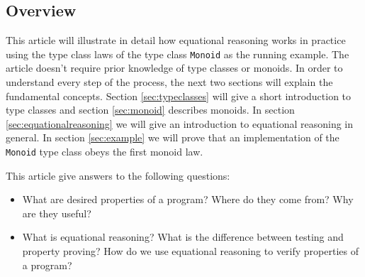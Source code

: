 \subsection{Overview}

This article will illustrate in detail how equational reasoning works in practice using the type class laws of the type class \verb|Monoid| as the running example. The article doesn't require prior knowledge of type classes or \glspl{monoid}. In order to understand every step of the process, the next two sections will explain the fundamental concepts.
Section \ref{sec:typeclasses} will give a short introduction to type classes and section \ref{sec:monoid} describes monoids. In section \ref{sec:equationalreasoning} we will give an introduction to equational reasoning in general. In section \ref{sec:example} we will prove that an implementation of the \verb|Monoid| type class obeys the first monoid law.  


This article give answers to the following questions:
\begin{itemize}
\item What are desired properties of a program? Where do they come from? Why are they useful?
\item What is equational reasoning? What is the difference between testing and property proving? How do we use equational reasoning to verify properties of a program?
\end{itemize}

